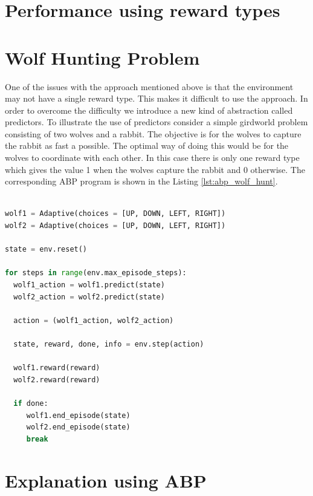 \documentclass[conference]{IEEEtran}
\begin{document}
\section{Performance using reward types}


\section{Wolf Hunting Problem}
One of the issues with the approach mentioned above is that the environment may not have a single reward
type. This makes it difficult to use the approach. In order to overcome the difficulty  we introduce a
new kind of abstraction called predictors. To illustrate the use of predictors consider a simple girdworld problem consisting
of two wolves and a rabbit. The objective is for the wolves to capture the rabbit as fast a possible.
The optimal way of doing this would be for the wolves to coordinate with each other. In this case there is only one
reward type which gives the value 1 when the wolves capture the rabbit and 0 otherwise. The corresponding ABP program is shown
in the Listing \ref{lst:abp_wolf_hunt}.



\begin{lstlisting}[language = Python,
                   label = {lst:abp_wolf_hunt},
                   caption = {Adaptive Program for wolf hunt problem},
                   captionpos = b]

wolf1 = Adaptive(choices = [UP, DOWN, LEFT, RIGHT])
wolf2 = Adaptive(choices = [UP, DOWN, LEFT, RIGHT])

state = env.reset()

for steps in range(env.max_episode_steps):
  wolf1_action = wolf1.predict(state)
  wolf2_action = wolf2.predict(state)

  action = (wolf1_action, wolf2_action)

  state, reward, done, info = env.step(action)

  wolf1.reward(reward)
  wolf2.reward(reward)

  if done:
     wolf1.end_episode(state)
     wolf2.end_episode(state)
     break

\end{lstlisting}

\section{Explanation using ABP}
\end{document}
